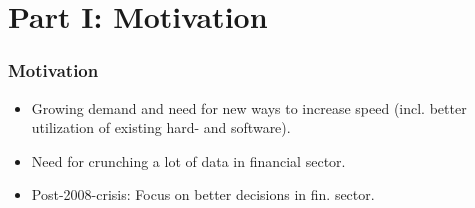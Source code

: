 \section{Part I: Motivation}

\begin{frame}
  \frametitle{Motivation}
  \begin{itemize}
    \item Growing demand and need for new ways to increase
      speed (incl. better utilization of existing hard- and
      software).
    \item Need for crunching a lot of data in financial sector.
    \item Post-2008-crisis: Focus on better decisions in
      fin. sector.
  \end{itemize}
\end{frame}
